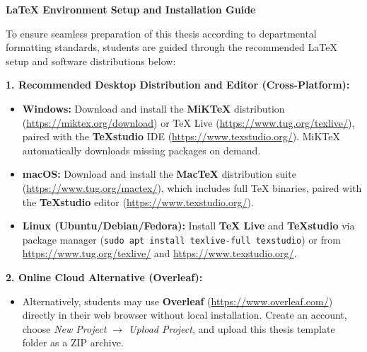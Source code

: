 \clearpage

\begin{onehalfspace}
\begin{center}
  {\fontsize{13pt}{16pt}\selectfont\bfseries \LaTeX{} Environment Setup and Installation Guide\par}
  \vspace{6pt}
\end{center}

\noindent
To ensure seamless preparation of this thesis according to departmental formatting standards, students are guided through the recommended \LaTeX{} setup and software distributions below:

\vspace{4pt}
\noindent
\textbf{1. Recommended Desktop Distribution and Editor (Cross-Platform):}
\begin{itemize}[leftmargin=*,noitemsep,topsep=2pt,parsep=1pt]
  \item \textbf{Windows:} Download and install the \textbf{MiKTeX} distribution (\url{https://miktex.org/download}) or TeX Live (\url{https://www.tug.org/texlive/}), paired with the \textbf{TeXstudio} IDE (\url{https://www.texstudio.org/}). MiKTeX automatically downloads missing packages on demand.
  \item \textbf{macOS:} Download and install the \textbf{MacTeX} distribution suite (\url{https://www.tug.org/mactex/}), which includes full TeX binaries, paired with the \textbf{TeXstudio} editor (\url{https://www.texstudio.org/}).
  \item \textbf{Linux (Ubuntu/Debian/Fedora):} Install \textbf{TeX Live} and \textbf{TeXstudio} via package manager (\texttt{sudo apt install texlive-full texstudio}) or from \url{https://www.tug.org/texlive/} and \url{https://www.texstudio.org/}.
\end{itemize}

\vspace{4pt}
\noindent
\textbf{2. Online Cloud Alternative (Overleaf):}
\begin{itemize}[leftmargin=*,noitemsep,topsep=2pt]
  \item Alternatively, students may use \textbf{Overleaf} (\url{https://www.overleaf.com/}) directly in their web browser without local installation. Create an account, choose \textit{New Project $\to$ Upload Project}, and upload this thesis template folder as a ZIP archive.
\end{itemize}


\end{onehalfspace}
